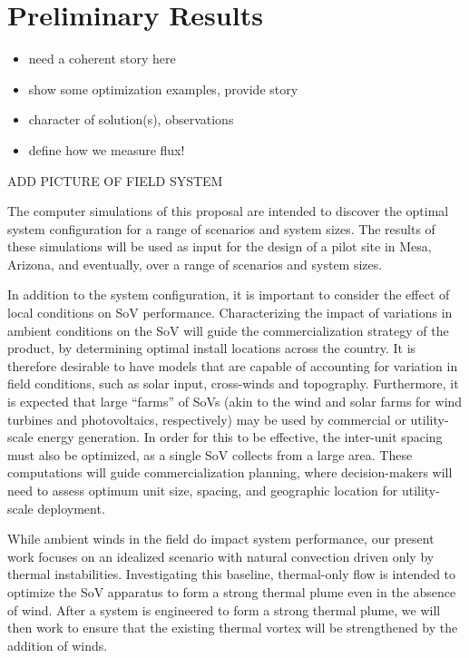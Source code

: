  
\section{Preliminary Results}
\label{sec:results}

\begin{itemize}
\item need a coherent story here
\item show some optimization examples, provide story
\item character of solution(s), observations
\item define how we measure flux!
\end{itemize}

ADD PICTURE OF FIELD SYSTEM 

The computer simulations of this proposal are intended to discover the
optimal system configuration for a range of scenarios and system sizes. The
results of these simulations will be used as input for the design of a
pilot site in Mesa, Arizona, and eventually, over a range of
scenarios and system sizes. 


In addition to the system configuration, it is important to consider the
effect of local conditions on SoV performance. Characterizing the impact
of variations in ambient conditions on the SoV will guide the
commercialization strategy of the product, by determining optimal
install locations across the country. It is therefore desirable to have models
that are capable of accounting for variation in field conditions, such
as solar input, cross-winds and topography. Furthermore, it is expected
that large ``farms'' of SoVs (akin to the wind and solar farms for wind
turbines and photovoltaics, respectively) may be used by commercial or
utility-scale energy generation. In order for this to be effective, 
the inter-unit spacing must also be optimized, as a single SoV collects
from a large area. These computations will guide commercialization
planning, where decision-makers will need to assess optimum unit size,
spacing, and geographic location for utility-scale deployment.  



While ambient winds in the field do impact system performance, our
present work focuses on an idealized scenario with natural convection
driven only by thermal instabilities. Investigating this baseline,
thermal-only flow is intended to optimize the SoV apparatus to form a
strong  thermal plume even in the absence of wind. After a system is
engineered to form a strong thermal plume, we will then work to ensure
that the existing thermal vortex will be strengthened by the addition of
winds.     

